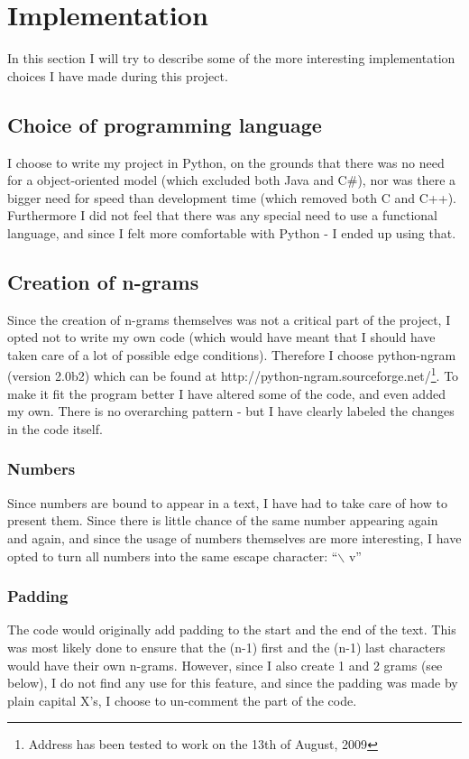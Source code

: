 \section{Implementation}
\label{implementation}

In this section I will try to describe some of the more interesting implementation choices I have made during this project.

\subsection{Choice of programming language}
I choose to write my project in Python, on the grounds that there was no need for a object-oriented model (which excluded both Java and C\#), nor was there a bigger need for speed than development time (which removed both C and C++). Furthermore I did not feel that there was any special need to use a functional language, and since I felt more comfortable with Python - I ended up using that.

\subsection{Creation of n-grams}
Since the creation of n-grams themselves was not a critical part of the project, I opted not to write my own code (which would have meant that I should have taken care of a lot of possible edge conditions). Therefore I choose python-ngram (version 2.0b2) which can be found at http://python-ngram.sourceforge.net/\footnote{Address has been tested to work on the 13th of August, 2009}. To make it fit the program better I have altered some of the code, and even added my own. There is no overarching pattern - but I have clearly labeled the changes in the code itself.
\subsubsection{Numbers}
Since numbers are bound to appear in a text, I have had to take care of how to present them. Since there is little chance of the same number appearing again and again, and since the usage of numbers themselves are more interesting, I have opted to turn all numbers into the same escape character: ``$\backslash$ v''
\subsubsection{Padding}
The code would originally add padding to the start and the end of the text. This was most likely done to ensure that the (n-1) first and the (n-1) last characters would have their own n-grams. However, since I also create 1 and 2 grams (see below), I do not find any use for this feature, and since the padding was made by plain capital X's, I choose to un-comment the part of the code.

